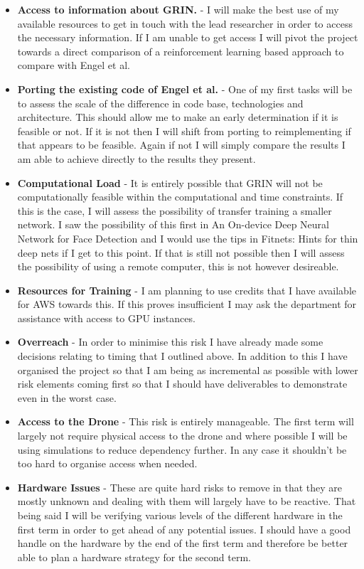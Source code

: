 \documentclass[]{final_report}
\begin{document}
\begin{itemize}
  \item \textbf{Access to information about GRIN.} - I will make the best use of my available resources to get in touch with the lead researcher in order to access the necessary information. If I am unable to get access I will pivot the project towards a direct comparison of a reinforcement learning based approach to compare with Engel et al.
  \item \textbf{Porting the existing code of Engel et al.} - One of my first tasks will be to assess the scale of the difference in code base, technologies and architecture. This should allow me to make an early determination if it is feasible or not. If it is not then I will shift from porting to reimplementing if that appears to be feasible. Again if not I will simply compare the results I am able to achieve directly to the results they present.
  \item \textbf{Computational Load} - It is entirely possible that GRIN will not be computationally feasible within the computational and time constraints. If this is the case, I will assess the possibility of transfer training a smaller network. I saw the possibility of this first in An On-device Deep Neural Network for Face Detection \cite{apple_machine_learning_journal_2017} and I would use the tips in Fitnets: Hints for thin deep nets \cite{Romero15fitnets:hints} if I get to this point. If that is still not possible then I will assess the possibility of using a remote computer, this is not however desireable.
  \item \textbf{Resources for Training} - I am planning  to use credits that I have available for AWS towards this. If this proves insufficient I may ask the department for assistance with access to GPU instances.
  \item \textbf{Overreach} - In order to minimise this risk I have already made some decisions relating to timing that I outlined above. In addition to this I have organised the project so that I am being as incremental as possible with lower risk elements coming first so that I should have deliverables to demonstrate even in the worst case. 
  \item \textbf{Access to the Drone} - This risk is entirely manageable. The first term will largely not require physical access to the drone and where possible I will be using simulations to reduce dependency further. In any case it shouldn't be too hard to organise access when needed.
  \item \textbf{Hardware Issues} - These are quite hard risks to remove in that they are mostly unknown and dealing with them will largely have to be reactive. That being said I will be verifying various levels of the different hardware in the first term in order to get ahead of any potential issues. I should have a good handle on the hardware by the end of the first term and therefore be better able to plan a hardware strategy for the second term.
\end{itemize}

%
\newpage



\label{endpage}
\end{document}
